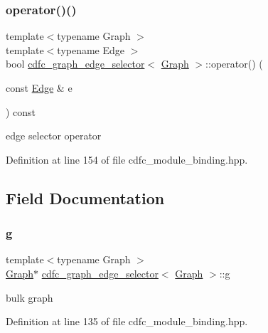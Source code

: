 \subsubsection{\texorpdfstring{operator()()}{operator()()}}
{\footnotesize\ttfamily template$<$typename Graph $>$ \\
template$<$typename Edge $>$ \\
bool \hyperlink{structcdfc__graph__edge__selector}{cdfc\+\_\+graph\+\_\+edge\+\_\+selector}$<$ \hyperlink{structGraph}{Graph} $>$\+::operator() (\begin{DoxyParamCaption}\item[{const \hyperlink{structEdge}{Edge} \&}]{e }\end{DoxyParamCaption}) const\hspace{0.3cm}{\ttfamily [inline]}}



edge selector operator 



Definition at line 154 of file cdfc\+\_\+module\+\_\+binding.\+hpp.



\subsection{Field Documentation}
\mbox{\label{structcdfc__graph__edge__selector_a08e72b11aa618c9df03a160be17d796a}} 
\subsubsection{\texorpdfstring{g}{g}}
{\footnotesize\ttfamily template$<$typename Graph $>$ \\
\hyperlink{structGraph}{Graph}$\ast$ \hyperlink{structcdfc__graph__edge__selector}{cdfc\+\_\+graph\+\_\+edge\+\_\+selector}$<$ \hyperlink{structGraph}{Graph} $>$\+::g\hspace{0.3cm}{\ttfamily [private]}}



bulk graph 



Definition at line 135 of file cdfc\+\_\+module\+\_\+binding.\+hpp.

\mbox{\label{structcdfc__graph__edge__selector_a6e55afea9cbe8e297f587797731148a7}} 
